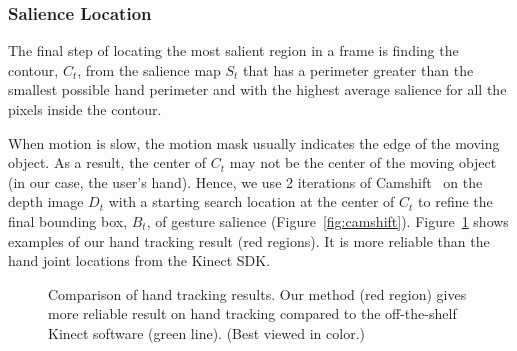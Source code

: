 \documentclass{sig-alternate-2013}
\begin{document}
\subsubsection{Salience Location}
The final step of locating the most salient region in a frame is finding the
contour, $C_t$, from the salience map $S_t$ that has a perimeter greater than
the smallest possible hand perimeter and with the highest average salience for all the pixels inside the contour.

When motion is slow, the motion mask usually indicates the edge of the moving
object. As a result, the center of $C_t$ may not be the center of the moving
object (in our case, the user's hand). Hence, we use 2 iterations of Camshift~\cite{Bradski98} on 
the depth image $D_t$ with a starting search location at the center of $C_t$ to refine
the final bounding box, $B_t$, of gesture salience (Figure~\ref{fig:camshift}). 
Figure~\ref{fig:compare-skeleton} shows examples of our hand tracking result (red regions). 
It is more reliable than the hand joint locations from the Kinect SDK.

\begin{figure}
\centering
{}
\caption{Comparison of hand tracking results. Our method (red region) gives more reliable result on hand tracking compared to the off-the-shelf Kinect software (green line). (Best viewed in color.)}
\label{fig:compare-skeleton}
\end{figure}
\end{document}
